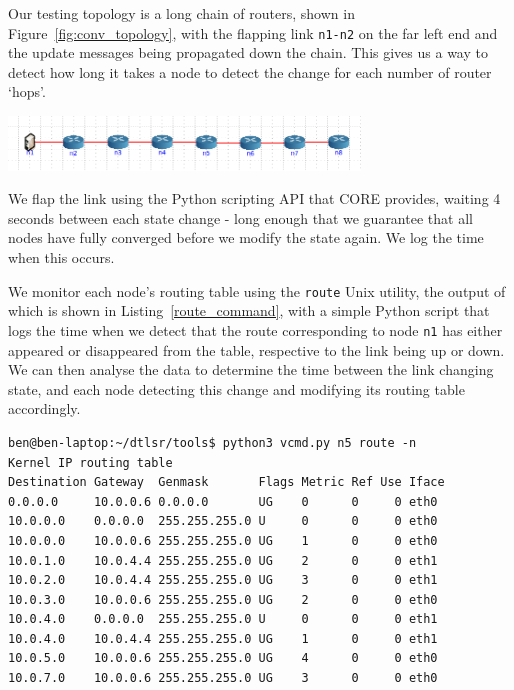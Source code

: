 \documentclass[withindex,glossary,openany]{cam-thesis}
\begin{document}
Our testing topology is a long chain of routers, shown in Figure~\ref{fig:conv_topology}, with the flapping link \texttt{n1-n2} on the far left end and the update messages being propagated down the chain. This gives us a way to detect how long it takes a node to detect the change for each number of router `hops'.

\begin{minipage}{1\textwidth} \centering
	\includegraphics[width=0.7\textwidth]{conv_topology}
	\label{fig:conv_topology}
\end{minipage}

We flap the link using the Python scripting API that CORE provides, waiting 4 seconds between each state change - long enough that we guarantee that all nodes have fully converged before we modify the state again. We log the time when this occurs.

We monitor each node's routing table using the \texttt{route} Unix utility, the output of which is shown in Listing~\ref{route_command}, with a simple Python script that logs the time when we detect that the route corresponding to node \texttt{n1} has either appeared or disappeared from the table, respective to the link being up or down. We can then analyse the data to determine the time between the link changing state, and each node detecting this change and modifying its routing table accordingly.

\begin{lstlisting}[label=route_command, caption=Example routing table of virtualised node, frame=tb]
ben@ben-laptop:~/dtlsr/tools$ python3 vcmd.py n5 route -n
Kernel IP routing table
Destination Gateway  Genmask       Flags Metric Ref Use Iface
0.0.0.0     10.0.0.6 0.0.0.0       UG    0      0     0 eth0
10.0.0.0    0.0.0.0  255.255.255.0 U     0      0     0 eth0
10.0.0.0    10.0.0.6 255.255.255.0 UG    1      0     0 eth0
10.0.1.0    10.0.4.4 255.255.255.0 UG    2      0     0 eth1
10.0.2.0    10.0.4.4 255.255.255.0 UG    3      0     0 eth1
10.0.3.0    10.0.0.6 255.255.255.0 UG    2      0     0 eth0
10.0.4.0    0.0.0.0  255.255.255.0 U     0      0     0 eth1
10.0.4.0    10.0.4.4 255.255.255.0 UG    1      0     0 eth1
10.0.5.0    10.0.0.6 255.255.255.0 UG    4      0     0 eth0
10.0.7.0    10.0.0.6 255.255.255.0 UG    3      0     0 eth0
\end{lstlisting}
\end{document}
